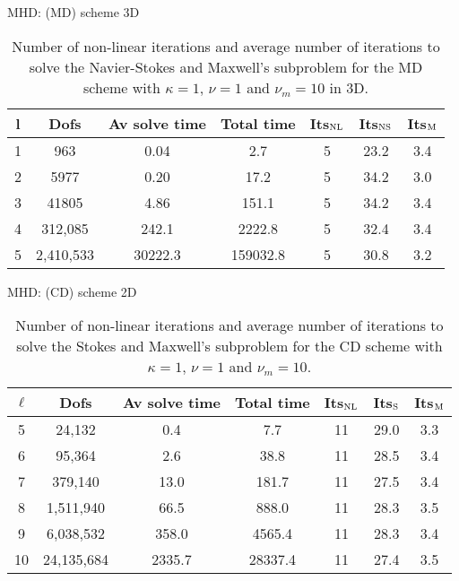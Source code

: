 \documentclass{beamer}
\begin{document}
\begin{frame}{MHD: (MD) scheme 3D}
  \begin{table}[h!] \small
\begin{center}
\begin{tabular}{ccccccc}
\hline
   l&  Dofs &  Av solve time &  Total time &    Its$_{\rm NL}$ &  Its$_{\rm NS}$ &  Its$_{\rm M}$ \\
\hline
1 &    963 &       0.04 &           2.7 &                  5 &        23.2 &        3.4 \\
2 &   5977 &       0.20 &          17.2 &                  5 &        34.2 &        3.0 \\
3 &  41805 &       4.86 &         151.1 &                  5 &        34.2 &        3.4 \\
 4 &  312,085 &     242.1 &        2222.8 &                  5 &        32.4 &        3.4 \\
 5 &  2,410,533 &   30222.3 &      159032.8 &                  5 &        30.8 &        3.2 \\
\hline
\end{tabular}
\caption{Number of non-linear iterations and average number of iterations to solve the Navier-Stokes and Maxwell's subproblem for the MD scheme with $\kappa = 1$, $\nu = 1$ and $\nu_m = 10$ in 3D.}
\label{tab:MD_3Dlarge_scale}
\end{center}
\end{table}
\end{frame}
\begin{frame}{{MHD: (CD) scheme 2D}}
  \begin{table}[h!] \small
  \begin{center}
  \begin{tabular}{ccccccc}
  \hline
   $\ell$ &      Dofs &  Av solve time &  Total time & Its$_{\rm NL}$ &     Its$_{\rm S}$ &    Its$_{\rm M}$ \\
  \hline
   5 &    24,132 &       0.4 &           7.7 &                 11 &        29.0 &        3.3 \\
   6 &    95,364 &       2.6 &          38.8 &                 11 &        28.5 &        3.4 \\
   7 &   379,140 &      13.0 &         181.7 &                 11 &        27.5 &        3.4 \\
   8 &  1,511,940 &      66.5 &         888.0 &                 11 &        28.3 &        3.5 \\
   9 &  6,038,532 &     358.0 &        4565.4 &                 11 &        28.3 &        3.4 \\
   10 &  24,135,684 &    2335.7 &       28337.4 &                 11 &        27.4 &        3.5 \\
  \hline
  \end{tabular}
  \caption{Number of non-linear iterations and average number of iterations to solve the Stokes and Maxwell's subproblem for the CD scheme with $\kappa = 1$, $\nu = 1$ and $\nu_m = 10$.}
  \label{tab:CD_large_scale}
  \end{center}
  \end{table}

\end{frame}
\end{document}
